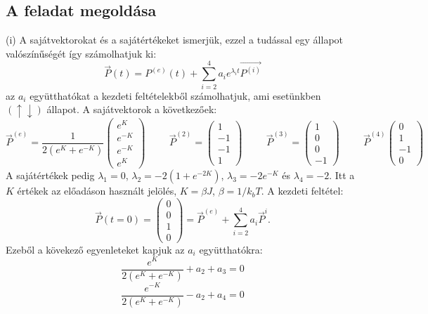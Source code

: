 \documentclass[12pt]{article}
\begin{document}
\subsection*{A feladat megoldása}
(i) A sajátvektorokat és a sajátértékeket ismerjük, ezzel a tudással egy állapot valószínűségét így számolhatjuk ki:
$$\vec{P}(t) = P^{(e)}(t)+\sum^4_{i = 2}a_ie^{\lambda_it}\vec{P^{(i)}}$$
az $a_i$ együtthatókat a kezdeti feltételekből számolhatjuk, ami esetünkben $(\uparrow\downarrow)$ állapot. A sajátvektorok a következőek:
\[
\vec{P}^{(e)} = \frac{1}{2(e^{K}+e^{-K})}
\begin{pmatrix}
	e^{K}\\
	e^{-K}\\
	e^{-K}\\
	e^{K}
\end{pmatrix}
\hspace{1cm}
\vec{P}^{(2)}=
  \begin{pmatrix}
	1\\
	-1\\
	-1\\
	1
\end{pmatrix}
\hspace{1cm}
\vec{P}^{(3)} =
\begin{pmatrix}
	1\\
	0\\
	0\\
	-1
\end{pmatrix}
\hspace{1cm}
\vec{P}^{(4)}
\begin{pmatrix}
	0\\
	1\\
	-1\\
	0
\end{pmatrix}
\]
A sajátértékek pedig $\lambda_1 = 0$, $\lambda_2 = -2(1 + e^{-2K})$, $\lambda_3 = -2e^{-K}$ és $\lambda_4 = -2$. Itt a $K$ értékek az előadáson használt jelölés, $K = \beta J$, $\beta = 1/k_bT$.
A kezdeti feltétel:
\[
\vec{P}(t = 0) = 
\begin{pmatrix}
	0\\
	0\\
	1\\
	0
\end{pmatrix}
= \vec{P}^{(e)} + \sum^{4}_{i = 2}a_i\vec{P}^{i}.
\]
Ezeből a kövekező egyenleteket kapjuk az $a_i$ együtthatókra:
\begin{equation}
\frac{e^K}{2(e^K+e^{-K})}+a_2+a_3 = 0
\end{equation}
\begin{equation}
\frac{e^{-K}}{2(e^K+e^{-K})}-a_2+a_4 = 0
\end{equation}
\end{document}
